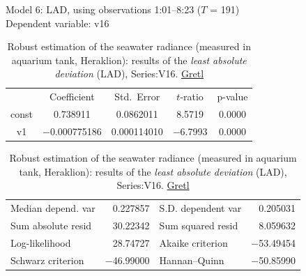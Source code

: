 \documentclass[11pt]{article}
\begin{document}
\begin{appendices}
\begin{table}
	\caption{Robust estimation of the seawater radiance (measured in aquarium tank, Heraklion): results of the \textit{least absolute deviation} (LAD), Series:V16. \href{http://gretl.sourceforge.net/}{Gretl}}
	\begin{center}
		Model 6: LAD, using observations 1:01--8:23 ($T$ = 191)\\
		Dependent variable: v16\\
	\vspace{1em}

	\begin{tabular}{|c c c c c|}
		  & {Coefficient} & {Std.\ Error} & {$t$-ratio} & {p-value} \\[1ex]
		const &   0.738911 &     0.0862011 &       8.5719 &         0.0000 \\
		v1 &   $-$0.000775186 &     0.000114010 &       $-$6.7993 &         0.0000 \\
	\end{tabular}

	\vspace{1ex}
	\begin{tabular}{lrlr}
		Median depend. var &  0.227857 & S.D. dependent var &  0.205031 \\
		Sum absolute resid &  30.22342 & Sum squared resid &  8.059632 \\
		Log-likelihood &  28.74727 & Akaike criterion & $-$53.49454 \\
		Schwarz criterion & $-$46.99000 & Hannan--Quinn & $-$50.85990 \\
	\end{tabular}
	\label{tab:12}
	\end{center}
\end{table}
\pagebreak
\newpage


\end{appendices}
\end{document}
